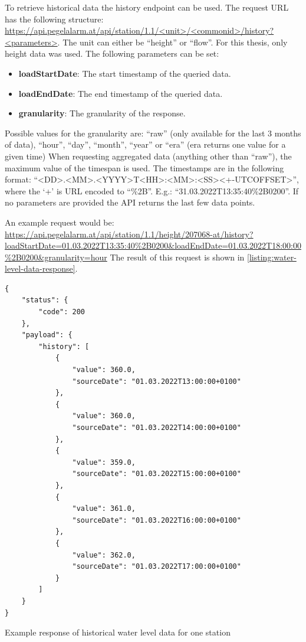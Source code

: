 To retrieve historical data the history endpoint can be used. The request URL has the following structure: \url{https://api.pegelalarm.at/api/station/1.1/<unit>/<commonid>/history?<parameters>}. The unit can either be ``height'' or ``flow''. For this thesis, only height data was used. The following parameters can be set:
\begin{itemize}
    \item \textbf{loadStartDate}: The start timestamp of the queried data.
    \item \textbf{loadEndDate}: The end timestamp of the queried data.
    \item \textbf{granularity}: The granularity of the response. 
\end{itemize}
Possible values for the granularity are: ``raw'' (only available for the last 3 months of data), ``hour'', ``day'', ``month'', ``year'' or ``era'' (era returns one value for a given time)
When requesting aggregated data (anything other than ``raw''), the maximum value of the timespan is used. The timestamps are in the following format: ``<DD>.<MM>.<YYYY>T<HH>:<MM>:<SS><+-UTCOFFSET>'', where the `+' is URL encoded to ``\%2B''. E.g.: ``31.03.2022T13:35:40\%2B0200''. If no parameters are provided the API returns the last few data points.

An example request would be: \url{https://api.pegelalarm.at/api/station/1.1/height/207068-at/history?loadStartDate=01.03.2022T13:35:40%2B0200&loadEndDate=01.03.2022T18:00:00%2B0200&granularity=hour} The result of this request is shown in \autoref{listing:water-level-data-response}.

\begin{listing}
\begin{verbatim}
{
    "status": {
        "code": 200
    },
    "payload": {
        "history": [
            {
                "value": 360.0,
                "sourceDate": "01.03.2022T13:00:00+0100"
            },
            {
                "value": 360.0,
                "sourceDate": "01.03.2022T14:00:00+0100"
            },
            {
                "value": 359.0,
                "sourceDate": "01.03.2022T15:00:00+0100"
            },
            {
                "value": 361.0,
                "sourceDate": "01.03.2022T16:00:00+0100"
            },
            {
                "value": 362.0,
                "sourceDate": "01.03.2022T17:00:00+0100"
            }
        ]
    }
}
\end{verbatim}
\caption{Example response of historical water level data for one station}
\label{listing:water-level-data-response}
\end{listing}


